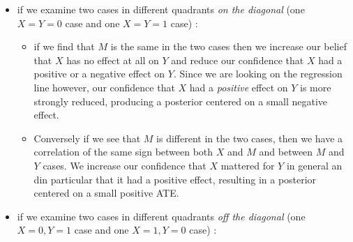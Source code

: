 \documentclass[
  12pt,
]{book}
\providecommand{\tightlist}{%
  \setlength{\itemsep}{0pt}\setlength{\parskip}{0pt}}
\begin{document}
\begin{itemize}
\item
  if we examine two cases in different quadrants \emph{on the diagonal} (one \(X=Y=0\) case and one \(X=Y=1\) case) :

  \begin{itemize}
  \tightlist
  \item
    if we find that \(M\) is the same in the two cases then we increase our belief that \(X\) has no effect at all on \(Y\) and reduce our confidence that \(X\) had a positive or a negative effect on \(Y\). Since we are looking on the regression line however, our confidence that \(X\) had a \emph{positive} effect on \(Y\) is more strongly reduced, producing a posterior centered on a small negative effect.
  \item
    Conversely if we see that \(M\) is different in the two cases, then we have a correlation of the same sign between both \(X\) and \(M\) and between \(M\) and \(Y\) cases. We increase our confidence that \(X\) mattered for \(Y\) in general an din particular that it had a positive effect, resulting in a posterior centered on a small positive ATE.
  \end{itemize}
\item
  if we examine two cases in different quadrants \emph{off the diagonal} (one \(X=0, Y=1\) case and one \(X=1, Y=0\) case) :


\end{itemize}
\end{document}

